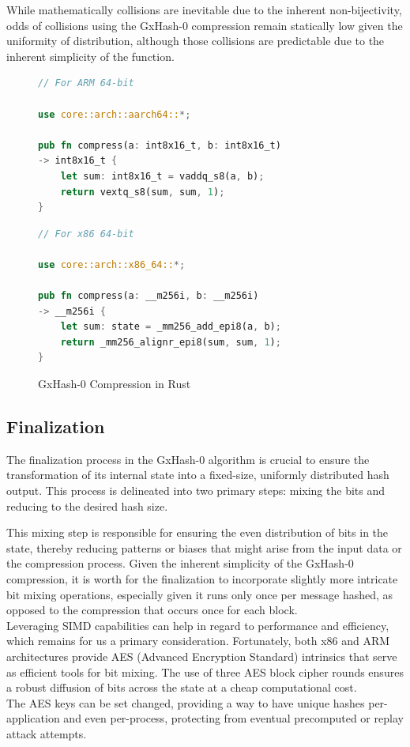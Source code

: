 \documentclass[10pt]{article}
\begin{document}
While mathematically collisions are inevitable due to the inherent non-bijectivity, odds of collisions using the GxHash-0 compression remain statically low given the uniformity of distribution, although those collisions are predictable due to the inherent simplicity of the function.

\begin{figure}[H]
\begin{multicols}{2}
\begin{lstlisting}[language=Rust, style=boxed]
// For ARM 64-bit

use core::arch::aarch64::*;

pub fn compress(a: int8x16_t, b: int8x16_t)
-> int8x16_t {
    let sum: int8x16_t = vaddq_s8(a, b);
    return vextq_s8(sum, sum, 1);
}
\end{lstlisting}
\columnbreak
\begin{lstlisting}[language=Rust, style=boxed]
// For x86 64-bit

use core::arch::x86_64::*;

pub fn compress(a: __m256i, b: __m256i)
-> __m256i {
    let sum: state = _mm256_add_epi8(a, b);
    return _mm256_alignr_epi8(sum, sum, 1);
}
\end{lstlisting}
\end{multicols}
\caption{GxHash-0 Compression in Rust}
\label{fig:compression_rust_example}
\end{figure}

\subsection{Finalization}

The finalization process in the GxHash-0 algorithm is crucial to ensure the transformation of its internal state into a fixed-size, uniformly distributed hash output. This process is delineated into two primary steps: mixing the bits and reducing to the desired hash size.

This mixing step is responsible for ensuring the even distribution of bits in the state, thereby reducing patterns or biases that might arise from the input data or the compression process. Given the inherent simplicity of the GxHash-0 compression, it is worth for the finalization to incorporate slightly more intricate bit mixing operations, especially given it runs only once per message hashed, as opposed to the compression that occurs once for each block.\\
Leveraging SIMD capabilities can help in regard to performance and efficiency, which remains for us a primary consideration. Fortunately, both x86 and ARM architectures provide AES (Advanced Encryption Standard) intrinsics that serve as efficient tools for bit mixing. The use of three AES block cipher rounds ensures a robust diffusion of bits across the state at a cheap computational cost.\\
The AES keys can be set changed, providing a way to have unique hashes per-application and even per-process, protecting from eventual precomputed or replay attack attempts.
\end{document}
